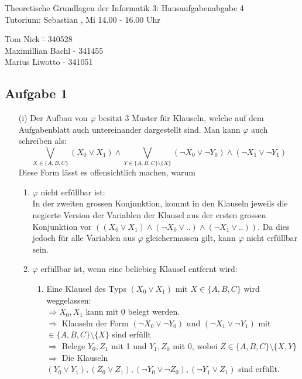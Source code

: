 \documentclass[a4paper,10pt]{article}
\begin{document}
\begin{center}
\Large{Theoretische Grundlagen der Informatik 3: Hausaufgabenabgabe 4} \\
\large{Tutorium: Sebastian , Mi 14.00 - 16.00 Uhr}
\end{center}
\begin{tabbing}
Tom Nick \hspace{2cm}\= - 340528\\
Maximillian Bachl \> - 341455 \\
Marius Liwotto\> -  341051
\end{tabbing}
	\subsection*{Aufgabe 1}
	\begin{enumerate}
	\item[(i)]
		Der Aufbau von \(\varphi\) besitzt 3 Muster für Klauseln, welche auf dem Aufgabenblatt auch untereinander dargestellt sind. Man kann \(\varphi \) auch schreiben als:
		\[ \bigvee_{X \in \{A,B,C\}} (X_0 \lor X_1) \land \bigvee_{Y \in \{A,B,C \}\setminus\{X\} }(\lnot X_0 \lor \lnot Y_0) \land (\lnot X_1 \lor \lnot Y_1) \]
		Diese Form lässt es offensichtlich machen, warum
		\begin{enumerate}[1.]
			\item $\varphi$ nicht erfüllbar ist: \\
				In der zweiten grossen Konjunktion, kommt in den Klauseln jeweils die negierte Version der Variablen der Klausel aus der ersten grossen Konjunktion vor $( (X_0 \lor X_1) \land (\lnot X_0 \lor ..) \land (\lnot X_1 \lor ..))$. Da dies jedoch für alle Variablen aus $\varphi$ gleichermassen gilt, kann $\varphi$ nicht erfüllbar sein.
			\item $\varphi$ erfüllbar ist, wenn eine beliebieg Klausel entfernt wird:
				\begin{enumerate}
				\item Eine Klausel des Typs $(X_0 \lor X_1)$  mit $ X \in \{ A,B,C\}$ wird weggelassen: \\
				$\Rightarrow X_0,X_1$ kann mit 0 belegt werden. \\
				$\Rightarrow $ Klauseln der Form $(\lnot X_0 \lor \lnot Y_0)$ und $(\lnot X_1 \lor \lnot Y_1)$ mit $ \in \{A,B,C \}\setminus\{X\}$  sind erfüllt\\
				$\Rightarrow$ Belege $Y_0,Z_1$ mit 1 und $Y_1,Z_0$ mit 0, wobei $Z \in \{A,B,C\}\setminus\{X,Y\}$ \\
				$\Rightarrow$ Die Klauseln $(Y_0 \lor Y_1),(Z_0 \lor Z_1),(\lnot Y_0 \lor \lnot Z_0), (\lnot Y_1 \lor Z_1)$ sind erfüllt.

\end{enumerate}
\end{enumerate}
\end{enumerate}
\end{document}
